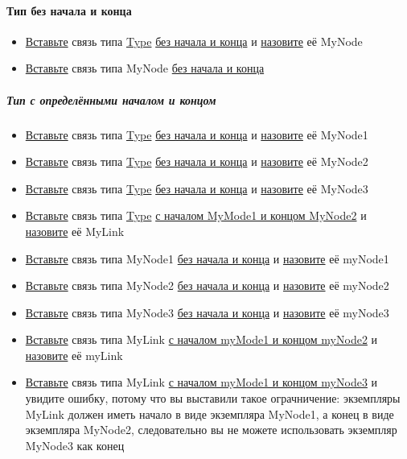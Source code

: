 \documentclass{article}
\begin{document}
\paragraph{Тип без начала и конца}
\begin{itemize}
  \item \hyperlink{DeepCase.InsertLink.Def}{Вставьте} связь типа \hyperlink{type.Def}{Type} \hyperlink{FAQ.HowToInsertLinkWithoutFromAndTo}{без начала и конца} и \hyperlink{FAQ.HowToSetName}{назовите} её MyNode
  \item \hyperlink{DeepCase.InsertLink.Def}{Вставьте} связь типа MyNode \hyperlink{FAQ.HowToInsertLinkWithoutFromAndTo}{без начала и конца}
\end{itemize}
\subparagraph{Тип с определёнными началом и концом}
\begin{itemize}
  \item \hyperlink{DeepCase.InsertLink.Def}{Вставьте} связь типа \hyperlink{type.Def}{Type} \hyperlink{FAQ.HowToInsertLinkWithoutFromAndTo}{без начала и конца} и \hyperlink{FAQ.HowToSetName}{назовите} её MyNode1
  \item \hyperlink{DeepCase.InsertLink.Def}{Вставьте} связь типа \hyperlink{type.Def}{Type} \hyperlink{FAQ.HowToInsertLinkWithoutFromAndTo}{без начала и конца} и \hyperlink{FAQ.HowToSetName}{назовите} её MyNode2
  \item \hyperlink{DeepCase.InsertLink.Def}{Вставьте} связь типа \hyperlink{type.Def}{Type} \hyperlink{FAQ.HowToInsertLinkWithoutFromAndTo}{без начала и конца} и \hyperlink{FAQ.HowToSetName}{назовите} её MyNode3
  \item \hyperlink{DeepCase.InsertLink.Def}{Вставьте} связь типа \hyperlink{type.Def}{Type} \hyperlink{FAQ.HowToInsertLinkWithFromAndTo}{с началом MyMode1 и концом MyNode2} и \hyperlink{FAQ.HowToSetName}{назовите} её MyLink
  \item \hyperlink{DeepCase.InsertLink.Def}{Вставьте} связь типа MyNode1 \hyperlink{FAQ.HowToInsertLinkWithoutFromAndTo}{без начала и конца} и \hyperlink{FAQ.HowToSetName}{назовите} её myNode1
  \item \hyperlink{DeepCase.InsertLink.Def}{Вставьте} связь типа MyNode2 \hyperlink{FAQ.HowToInsertLinkWithoutFromAndTo}{без начала и конца} и \hyperlink{FAQ.HowToSetName}{назовите} её myNode2
  \item \hyperlink{DeepCase.InsertLink.Def}{Вставьте} связь типа MyNode3 \hyperlink{FAQ.HowToInsertLinkWithoutFromAndTo}{без начала и конца} и \hyperlink{FAQ.HowToSetName}{назовите} её myNode3
  \item \hyperlink{DeepCase.InsertLink.Def}{Вставьте} связь типа MyLink \hyperlink{FAQ.HowToInsertLinkWithFromAndTo}{с началом myMode1 и концом myNode2} и \hyperlink{FAQ.HowToSetName}{назовите} её myLink
  \item \hyperlink{DeepCase.InsertLink.Def}{Вставьте} связь типа MyLink \hyperlink{FAQ.HowToInsertLinkWithFromAndTo}{с началом myMode1 и концом myNode3} и увидите ошибку, потому что вы выставили такое ограчничение: экземпляры MyLink должен иметь начало в виде экземпляра  MyNode1, а конец в виде экземпляра MyNode2, следовательно вы не можете использовать экземпляр MyNode3 как конец
\end{itemize}
\end{document}
